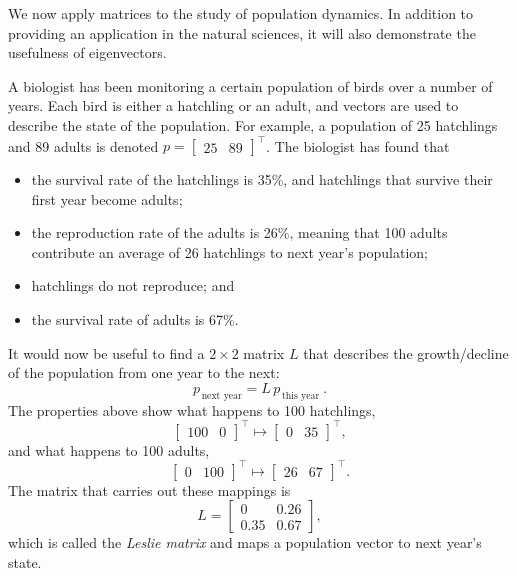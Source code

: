 \begin{application}
We now apply matrices to the study of population dynamics. In addition to providing an application in the natural sciences, it will also demonstrate the usefulness of eigenvectors.

A biologist has been monitoring a certain population of birds over a number of years. Each bird is either a hatchling or an adult, and vectors are used to describe the state of the population. For example, a population of 25 hatchlings and 89 adults is denoted $p = \begin{bmatrix} 25 & 89 \end{bmatrix}^\top$. The biologist has found that
\begin{itemize}
	\item the survival rate of the hatchlings is 35\%, and hatchlings that survive their first year become adults;
	\item the reproduction rate of the adults is 26\%, meaning that 100 adults contribute an average of 26 hatchlings to next year's population;
	\item hatchlings do not reproduce; and
	\item the survival rate of adults is 67\%.
\end{itemize}

It would now be useful to find a $2 \times 2$ matrix $L$ that describes the growth/decline of the population from one year to the next:
\[ p_{\,\text{next year}} = L \, p_{\,\text{this year}} \:. \]
The properties above show what happens to 100 hatchlings,
\[ \begin{bmatrix} 100 & 0 \end{bmatrix}^\top \mapsto
\begin{bmatrix} 0 & 35 \end{bmatrix}^\top, \]
and what happens to 100 adults, 
\[ \begin{bmatrix} 0 & 100 \end{bmatrix}^\top \mapsto
\begin{bmatrix} 26 & 67 \end{bmatrix}^\top. \]
The matrix that carries out these mappings is
\[ L = \begin{bmatrix}
 0 & 0.26 \\ 0.35 & 0.67
\end{bmatrix}, \]
which is called the \emph{Leslie matrix} and maps a population vector to next year's state.


\end{application}
